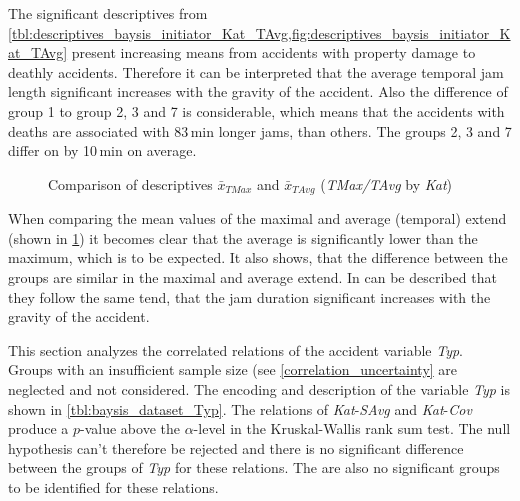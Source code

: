 The significant descriptives from \cref{tbl:descriptives_baysis_initiator_Kat_TAvg,fig:descriptives_baysis_initiator_Kat_TAvg} present increasing means from accidents with property damage to deathly accidents. Therefore it can be interpreted that the average temporal jam length significant increases with the gravity of the accident. Also the difference of group 1 to group 2, 3 and 7 is considerable, which means that the accidents with deaths are associated with 83\,min longer jams, than others. The groups 2, 3 and 7 differ on by 10\,min on average. 
\begin{figure}[ht!]
	\data
    \pgfplotstablesort[sort key=meanTAvg, sort cmp=float >]{\datasorted}{\data}
    \tiny
    \centering
	\caption{Comparison of descriptives $\bar{x}_{TMax}$ and $\bar{x}_{TAvg}$ (\textit{TMax/TAvg} by \textit{Kat})}
	\label{fig:baysis_initiator_meancomparison_Kat_temporal}
\end{figure}
When comparing the mean values of the maximal and average (temporal) extend (shown in \cref{fig:baysis_initiator_meancomparison_Kat_temporal}) it becomes clear that the average is significantly lower than the maximum, which is to be expected. It also shows, that the difference between the groups are similar in the maximal and average extend. In can be described that they follow the same tend, that the jam duration significant increases with the gravity of the accident.

This section analyzes the correlated relations of the accident variable \textit{Typ}. Groups with an insufficient sample size (see \cref{correlation_uncertainty} are neglected and not considered. The encoding and description of the variable \textit{Typ} is shown in \cref{tbl:baysis_dataset_Typ}. The relations of \textit{Kat}-\textit{SAvg} and 
\textit{Kat}-\textit{Cov} produce a $p$-value above the $\alpha$-level in the Kruskal-Wallis rank sum test. The null hypothesis can't therefore be rejected and there is no significant difference between the groups of \textit{Typ} for these relations. The are also no significant groups to be identified for these relations.

